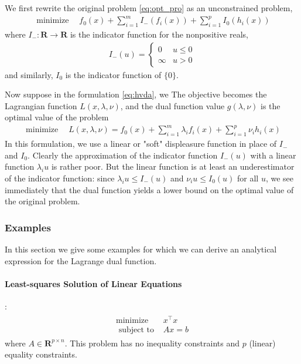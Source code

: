 \documentclass{article}
\begin{document}
We first rewrite the original problem \cref{eq:opt_pro} as an unconstrained problem,
\begin{align}
\operatorname{minimize} \quad f_{0}(x)+\sum_{i=1}^{m} I_{-}\left(f_{i}(x)\right)+\sum_{i=1}^{p} I_{0}\left(h_{i}(x)\right)\label{eq:hvda}
\end{align}
where $I_{-}: \mathbf{R} \rightarrow \mathbf{R}$ is the indicator function for the nonpositive reals,
\begin{align*}
I_{-}(u)= \begin{cases}0 & u \leq 0 \\ \infty & u>0\end{cases}
\end{align*}
and similarly, $I_{0}$ is the indicator function of $\{0\}$. 

Now suppose in the formulation \cref{eq:hvda}, we  The objective becomes the Lagrangian function $L(x, \lambda, \nu)$, and the dual function value $g(\lambda, \nu)$ is the optimal value of the problem
\begin{align*}
\operatorname{minimize} \quad L(x, \lambda, \nu)=f_{0}(x)+\sum_{i=1}^{m} \lambda_{i} f_{i}(x)+\sum_{i=1}^{p} \nu_{i} h_{i}(x)
\end{align*}
In this formulation, we use a linear or "soft" displeasure function in place of $I_{-}$ and $I_{0} .$ 
Clearly the approximation of the indicator function $I_{-}(u)$ with a linear function $\lambda_{i} u$ is rather poor. But the linear function is at least an underestimator of the indicator function: since $\lambda_{i} u \leq I_{-}(u)$ and $\nu_{i} u \leq I_{0}(u)$ for all $u$, we see immediately that the dual function yields a lower bound on the optimal value of the original problem.

\subsubsection{Examples}
In this section we give some examples for which we can derive an analytical expression for the Lagrange dual function.
\paragraph{Least-squares Solution of Linear Equations}
:
\begin{align*}
\begin{array}{ll}
\operatorname{minimize} & x^{\top} x \\
\text { subject to } & A x=b
\end{array}
\end{align*}
where $A \in \mathbf{R}^{p \times n}$. This problem has no inequality constraints and $p$ (linear) equality constraints. 
\end{document}
